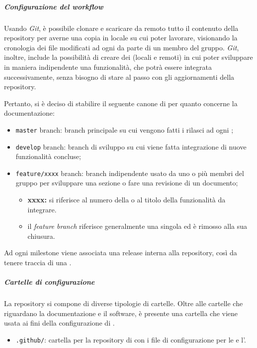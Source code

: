 		\subparagraph{Configurazione del workflow}

		Usando \textit{Git}, è possibile clonare e scaricare da remoto tutto il contenuto della repository per averne una copia in locale su cui poter lavorare, visionando la cronologia dei file modificati ad ogni  da parte di un membro del gruppo.
		\textit{Git}, inoltre, include la possibilità di creare dei  (locali e remoti) in cui poter sviluppare in maniera indipendente una funzionalità, che potrà essere integrata successivamente, senza bisogno di stare al passo con gli aggiornamenti della repository.

		Pertanto, si è deciso di stabilire il seguente canone di  per quanto concerne la documentazione:
		\begin{itemize}
			\item \verb!master! branch: branch principale su cui vengono fatti i rilasci ad ogni ;
			\item \verb!develop! branch: branch di sviluppo su cui viene fatta integrazione di nuove funzionalità concluse;
			\item \verb!feature/xxxx! branch: branch indipendente usato da uno o più membri del gruppo per sviluppare una sezione o fare una revisione di un documento;
			\begin{itemize}
				\item \textbf{xxxx:} si riferisce al numero della  o al titolo della funzionalità da integrare.
				\item il \textit{feature branch} riferisce generalmente una singola  ed è rimosso alla sua chiusura.
			\end{itemize}
		\end{itemize}

		Ad ogni milestone viene associata una release interna alla repository, così da tenere traccia di una .

		\subparagraph{Cartelle di configurazione}

		La repository si compone di diverse tipologie di cartelle. Oltre alle cartelle che riguardano la documentazione e il software, è presente una cartella che viene usata ai fini della configurazione di .
		\begin{itemize}
			\item \verb!.github/!: cartella per la repository di  con i file di configurazione per le  e l'.
		\end{itemize}

